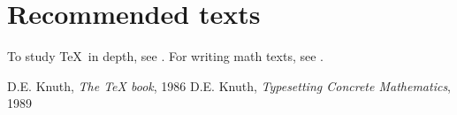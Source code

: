 \documentclass{article}
\begin{document}
\section*{Recommended texts} %
To study \TeX\ in depth, see \cite{DK86}. For writing math texts, see \cite{DK89}.

\begin{thebibliography}{Knuth89}
 D.E. Knuth, \emph{The {\TeX} book}, 1986
 D.E. Knuth, \emph{Typesetting Concrete Mathematics}, 1989
\end{thebibliography}
\end{document}
